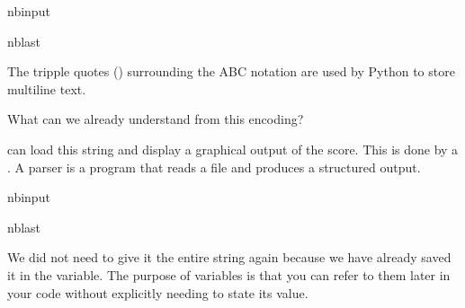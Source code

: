 \documentclass[letterpaper,10pt,english]{sphinxmanual}
\begin{document}
\begin{sphinxuseclass}{nbinput}
\begin{sphinxuseclass}{nblast}
{
\begin{sphinxVerbatim}[commandchars=\\\{\}]
\llap{\color{nbsphinxin}[6]:\,\hspace{\fboxrule}\hspace{\fboxsep}}  
\end{sphinxVerbatim}
}

\end{sphinxuseclass}
\end{sphinxuseclass}
\sphinxAtStartPar
The tripple quotes () surrounding the ABC notation are used by Python to store multi\sphinxhyphen{}line text.

\sphinxAtStartPar
What can we already understand from this encoding?

\sphinxAtStartPar
{} can load this string and display a graphical output of the score. This is done by a . A parser is a program that reads a file and produces a structured output.

\begin{sphinxuseclass}{nbinput}
\begin{sphinxuseclass}{nblast}
{
\begin{sphinxVerbatim}[commandchars=\\\{\}]
\llap{\color{nbsphinxin}[7]:\,\hspace{\fboxrule}\hspace{\fboxsep}}  
\end{sphinxVerbatim}
}

\end{sphinxuseclass}
\end{sphinxuseclass}
\sphinxAtStartPar
We did not need to give it the entire string again because we have already saved it in the  variable. The purpose of variables is that you can refer to them later in your code without explicitly needing to state its value.
\end{document}
